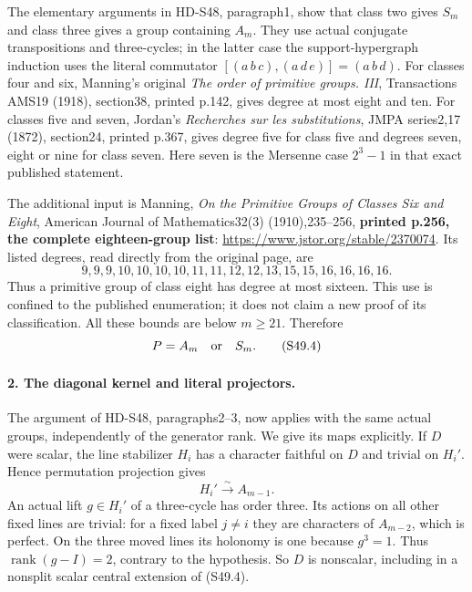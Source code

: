 The elementary arguments in HD-S48, paragraph1, show that
class two gives \(S_m\) and class three gives a group
containing \(A_m\). They use actual conjugate transpositions
and three-cycles; in the latter case the support-hypergraph
induction uses the literal commutator
\([(a\,b\,c),(a\,d\,e)]=(a\,b\,d)\).
For classes four and six, Manning's original
\emph{The order of primitive groups. III}, Transactions AMS19
(1918), section38, printed p.142, gives degree at most eight
and ten. For classes five and seven, Jordan's
\emph{Recherches sur les substitutions}, JMPA series2,17
(1872), section24, printed p.367, gives degree five for class
five and degrees seven, eight or nine for class seven.
Here seven is the Mersenne case \(2^3-1\) in that exact
published statement.

The additional input is Manning,
\emph{On the Primitive Groups of Classes Six and Eight},
American Journal of Mathematics32(3) (1910),235--256,
\textbf{printed p.256, the complete eighteen-group list}:
\url{https://www.jstor.org/stable/2370074}.
Its listed degrees, read directly from the original page, are
\[
 9,9,9,10,10,10,10,11,11,12,12,13,15,15,16,16,16,16.
                                                               \tag{S49.3}
\]
Thus a primitive group of class eight has degree at most
sixteen. This use is confined to the published enumeration;
it does not claim a new proof of its classification.
All these bounds are below \(m\ge21\). Therefore
\[
                         P=A_m\quad\hbox{or}\quad S_m.
                                                               \tag{S49.4}
\]

\paragraph{2. The diagonal kernel and literal projectors.}
The argument of HD-S48, paragraphs2--3, now applies with the
same actual groups, independently of the generator rank.
We give its maps explicitly. If \(D\) were scalar, the
line stabilizer \(H_i\) has a character faithful on \(D\)
and trivial on \(H_i'\). Hence permutation projection gives
\[
                  H_i'\xrightarrow{\sim}A_{m-1}.
                                                               \tag{S49.5}
\]
An actual lift \(g\in H_i'\) of a three-cycle has order
three. Its actions on all other fixed lines are trivial:
for a fixed label \(j\ne i\) they are characters of
\(A_{m-2}\), which is perfect. On the three moved lines
its holonomy is one because \(g^3=1\). Thus
\(\operatorname{rank}(g-I)=2\), contrary to the hypothesis.
So \(D\) is nonscalar, including in a nonsplit scalar
central extension of (S49.4).


